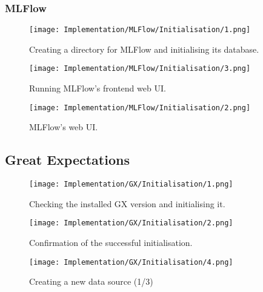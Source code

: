 \subsubsection{MLFlow}

\begin{figure}[H]
    \centering
    \texttt{[image: Implementation/MLFlow/Initialisation/1.png]}
    \caption{Creating a directory for MLFlow and initialising its database.}
    \label{fig:MLFlowInit}
\end{figure}

\begin{figure}[H]
    \centering
    \texttt{[image: Implementation/MLFlow/Initialisation/3.png]}
    \caption{Running MLFlow's frontend web UI.}
    \label{fig:MLFlowUICmd}
\end{figure}

\begin{figure}[H]
    \centering
    \texttt{[image: Implementation/MLFlow/Initialisation/2.png]}
    \caption{MLFlow's web UI.}
    \label{fig:MLFlowEmptyUI}
\end{figure}

\subsection{Great Expectations}

\begin{figure}[H]
    \centering
    \texttt{[image: Implementation/GX/Initialisation/1.png]}
    \caption{Checking the installed GX version and initialising it.}
    \label{fig:GXVersion}
\end{figure}

\begin{figure}[H]
    \centering
    \texttt{[image: Implementation/GX/Initialisation/2.png]}
    \caption{Confirmation of the successful initialisation.}
    \label{fig:GXInitConfirm}
\end{figure}


\begin{figure}[H]
    \centering
    \texttt{[image: Implementation/GX/Initialisation/4.png]}
    \caption{Creating a new data source (1/3)}
    \label{fig:GXDatasource1}
\end{figure}

